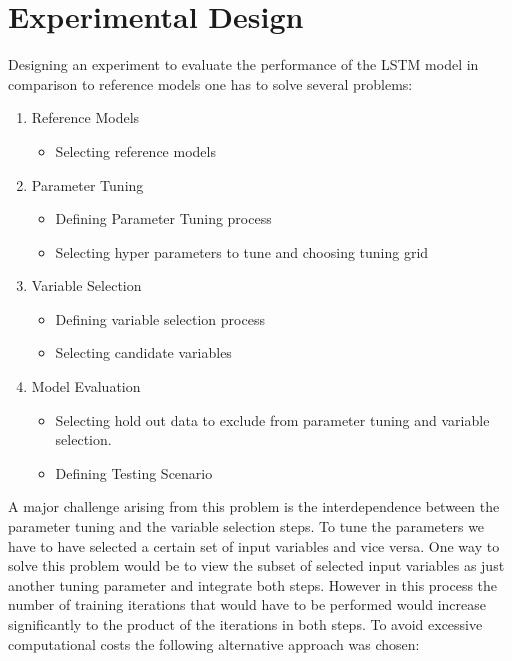 \section{Experimental Design}
Designing an experiment to evaluate the performance of the LSTM model in comparison to reference models one has to solve several problems:
\begin{enumerate}
\item Reference Models\begin{itemize}
	\item Selecting reference models
\end{itemize}
\item Parameter Tuning \begin{itemize}
	\item Defining Parameter Tuning process
	\item Selecting hyper parameters to tune and choosing tuning grid
\end{itemize}
\item Variable Selection \begin{itemize}
	\item Defining variable selection process
	\item Selecting candidate variables
\end{itemize}
\item Model Evaluation \begin{itemize}
\item Selecting hold out data to exclude from parameter tuning and variable selection.
\item Defining Testing Scenario
\end{itemize}	
\end{enumerate}

A major challenge arising from this problem is the interdependence between the parameter tuning and the variable selection steps. To tune the parameters we have to have selected a certain set of input variables and vice versa. One way to solve this problem would be to view the subset of selected input variables as just another tuning parameter and integrate both steps. However in this process the number of training iterations that would have to be performed would increase significantly to the product of the iterations in both steps. To avoid excessive computational costs the following alternative approach was chosen:

